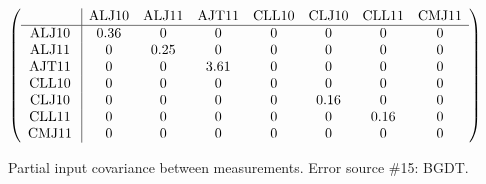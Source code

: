\begin{table}[H]
\scriptsize
\begin{center}
\renewcommand{\arraystretch}{1.1}
\begin{math}\left(\begin{array}{c|ccccccc}
 & \mathrm{ALJ10} & 
\mathrm{ALJ11} & 
\mathrm{AJT11} & 
\mathrm{CLL10} & 
\mathrm{CLJ10} & 
\mathrm{CLL11} & 
\mathrm{CMJ11} \\
\hline
\mathrm{ALJ10} \hspace*{2pt} &       0.36 &  0 &  0 &  0 &  0 &  0 &  0 \\
\mathrm{ALJ11} \hspace*{2pt} &  0 &       0.25 &  0 &  0 &  0 &  0 &  0 \\
\mathrm{AJT11} \hspace*{2pt} &  0 &  0 &       3.61 &  0 &  0 &  0 &  0 \\
\mathrm{CLL10} \hspace*{2pt} &  0 &  0 &  0 &  0 &  0 &  0 &  0 \\
\mathrm{CLJ10} \hspace*{2pt} &  0 &  0 &  0 &  0 &       0.16 &  0 &  0 \\
\mathrm{CLL11} \hspace*{2pt} &  0 &  0 &  0 &  0 &  0 &       0.16 &  0 \\
\mathrm{CMJ11} \hspace*{2pt} &  0 &  0 &  0 &  0 &  0 &  0 &  0 \\
\end{array}\right)\end{math}
\caption{Partial input covariance between measurements. Error source \#15: BGDT.}
\renewcommand{\arraystretch}{1}
\end{center}
\end{table}
